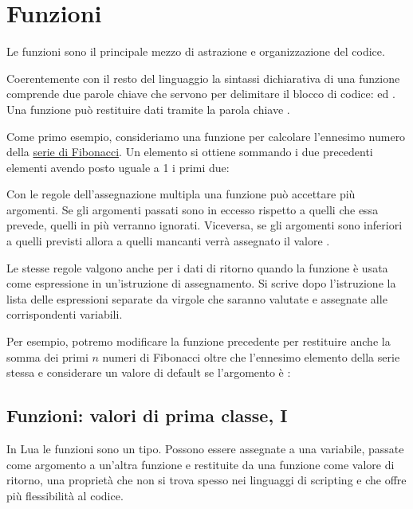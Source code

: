 
\chapter{Funzioni}

Le funzioni sono il principale mezzo di astrazione e organizzazione del codice.

Coerentemente con il resto del linguaggio la sintassi dichiarativa di una
funzione comprende due parole chiave che servono per delimitare il blocco di
codice:  ed . Una funzione può restituire dati tramite la
parola chiave .

Come primo esempio, consideriamo una funzione per calcolare l'ennesimo numero
della \href{http://it.wikipedia.org/wiki/Successione_di_Fibonacci}{serie di
Fibonacci}. Un elemento si ottiene sommando i due precedenti elementi avendo
posto uguale a 1 i primi due:

Con le regole dell'assegnazione multipla una funzione può accettare più
argomenti. Se gli argomenti passati sono in eccesso rispetto a quelli che essa
prevede, quelli in più verranno ignorati. Viceversa, se gli argomenti sono
inferiori a quelli previsti allora a quelli mancanti verrà assegnato il valore
.

Le stesse regole valgono anche per i dati di ritorno quando la funzione è usata
come espressione in un'istruzione di assegnamento. Si scrive dopo l'istruzione
 la lista delle espressioni separate da virgole che
saranno valutate e assegnate alle corrispondenti variabili.

Per esempio, potremo modificare la funzione precedente per restituire anche la
somma dei primi \( n \) numeri di Fibonacci oltre che l'ennesimo elemento della
serie stessa e considerare un valore di default se l'argomento è :


\section{Funzioni: valori di prima classe, I}

In Lua le funzioni sono un tipo. Possono essere assegnate a una variabile,
passate come argomento a un'altra funzione e restituite da una funzione come
valore di ritorno, una proprietà che non si trova spesso nei linguaggi di
scripting e che offre più flessibilità al codice.

